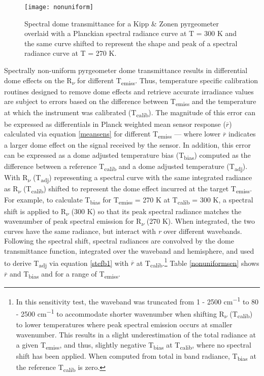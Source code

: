 \begin{bibunit}
\begin{figure}[H]
	\centering
	\texttt{[image: nonuniform]}
	\caption{Spectral dome transmittance for a Kipp \& Zonen pyrgeometer overlaid with a Planckian spectral radiance curve at T = 300 \si{\kelvin} and the same curve shifted to represent the shape and peak of a spectral radiance curve at T = 270 \si{\kelvin}.}
	\label{nonuniform}
\end{figure}

Spectrally non-uniform pyrgeometer dome transmittance results in differential dome effects on the R\textsubscript{$\nu$} for different T\textsubscript{emiss}. Thus, temperature specific calibration routines designed to remove dome effects and retrieve accurate irradiance values are subject to errors based on the difference between T\textsubscript{emiss} and the temperature at which the instrument was calibrated (T\textsubscript{calib}). The magnitude of this error can be expressed as differentials in Planck weighted mean sensor response ($\overline{r} $) calculated via equation \ref{meansens} for different T\textsubscript{emiss} --- where lower $\overline{r} $ indicates a larger dome effect on the signal received by the sensor. In addition, this error can be expressed as a dome adjusted temperature bias (T\textsubscript{bias}) computed as the difference between a reference T\textsubscript{calib} and a dome adjusted temperature (T\textsubscript{adj}). With R\textsubscript{$\nu$} (T\textsubscript{adj}) representing a spectral curve with the same integrated radiance as R\textsubscript{$\nu$} (T\textsubscript{calib}) shifted to represent the dome effect incurred at the target T\textsubscript{emiss}. For example, to calculate T\textsubscript{bias} for T\textsubscript{emiss} = 270 \si{\kelvin} at T\textsubscript{calib} = 300 \si{\kelvin}, a spectral shift is applied to R\textsubscript{$\nu$} (300 \si{\kelvin}) so that its peak spectral radiance matches the wavenumber of peak spectral emission for R\textsubscript{$\nu$} (270 \si{\kelvin}). When integrated, the two curves have the same radiance, but interact with \textit{r} over different wavebands. Following the spectral shift, spectral radiances are convolved by the dome transmittance function, integrated over the waveband and hemisphere, and used to derive T\textsubscript{adj} via equation \ref{stefb1} with $\overline{r}$ at T\textsubscript{calib}.\footnote{In this sensitivity test, the waveband was truncated from 1 - 2500 \si{cm^{-1}} to 80 - 2500 \si{cm^{-1}} to accommodate shorter wavenumber when shifting R\textsubscript{$\nu$} (T\textsubscript{calib}) to lower temperatures where peak spectral emission occurs at smaller wavenumber. This results in a slight underestimation of the total radiance at a given T\textsubscript{emiss}, and thus, slightly negative T\textsubscript{bias} at T\textsubscript{calib}, where no spectral shift has been applied. When computed from total in band radiance, T\textsubscript{bias} at the reference T\textsubscript{calib} is zero.} Table \ref{nonuniformsen} shows $\overline{r}$ and T\textsubscript{bias} and for a range of T\textsubscript{emiss}.


\end{bibunit}
